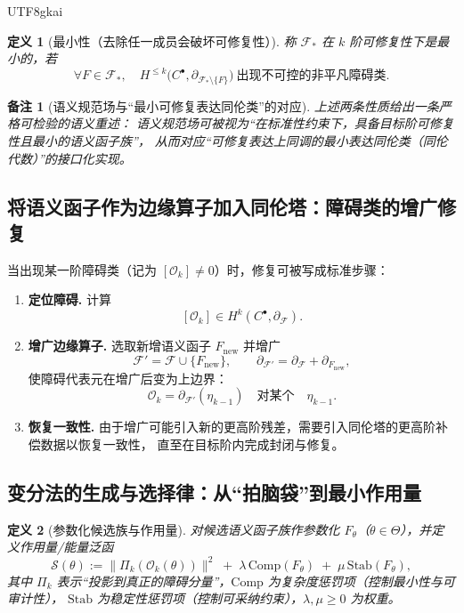 \documentclass[12pt]{article}
\newtheorem{definition}{定义}[section]
\newtheorem{remark}{备注}[section]
\begin{document}
\begin{CJK*}{UTF8}{gkai}
\begin{definition}[最小性（去除任一成员会破坏可修复性）]
称 $\mathcal{F}_\ast$ 在 $k$ 阶可修复性下是最小的，若
\[
\forall F\in \mathcal{F}_\ast,\quad
H^{\le k}\bigl(C^\bullet,\partial_{\mathcal{F}_\ast\setminus\{F\}}\bigr)\ \text{出现不可控的非平凡障碍类}.
\]
\end{definition}

\begin{remark}[语义规范场与“最小可修复表达同伦类”的对应]
上述两条性质给出一条严格可检验的语义重述：
语义规范场可被视为“在标准性约束下，具备目标阶可修复性且最小的语义函子族”，
从而对应“可修复表达上同调的最小表达同伦类（同伦代数）”的接口化实现。
\end{remark}

\subsection{将语义函子作为边缘算子加入同伦塔：障碍类的增广修复}
\label{subsec:tex20-ch2-homotopy-tower-repair}

当出现某一阶障碍类（记为 $[\mathcal{O}_k]\neq 0$）时，修复可被写成标准步骤：
\begin{enumerate}
  \item \textbf{定位障碍.} 计算
  \[
  [\mathcal{O}_k]\in H^k(C^\bullet,\partial_{\mathcal{F}}).
  \]
  \item \textbf{增广边缘算子.} 选取新增语义函子 $F_{\mathrm{new}}$ 并增广
  \[
  \mathcal{F}'=\mathcal{F}\cup\{F_{\mathrm{new}}\},
  \qquad
  \partial_{\mathcal{F}'}=\partial_{\mathcal{F}}+\partial_{F_{\mathrm{new}}},
  \]
  使障碍代表元在增广后变为上边界：
  \[
  \mathcal{O}_k=\partial_{\mathcal{F}'}(\eta_{k-1})
  \quad\text{对某个}\quad \eta_{k-1}.
  \]
  \item \textbf{恢复一致性.} 由于增广可能引入新的更高阶残差，需要引入同伦塔的更高阶补偿数据以恢复一致性，
  直至在目标阶内完成封闭与修复。\cite{EdgeOperatorTowerTex17,AxiomSemanticsWorkflowTex18}
\end{enumerate}

\subsection{变分法的生成与选择律：从“拍脑袋”到最小作用量}
\label{subsec:tex20-ch2-variational-selection}

\begin{definition}[参数化候选族与作用量]
对候选语义函子族作参数化 $F_\theta$（$\theta\in\Theta$），并定义作用量/能量泛函
\[
\mathcal{S}(\theta):=
\bigl\|\Pi_k(\mathcal{O}_k(\theta))\bigr\|^2
\;+\;
\lambda\,\mathrm{Comp}(F_\theta)
\;+\;
\mu\,\mathrm{Stab}(F_\theta),
\]
其中 $\Pi_k$ 表示“投影到真正的障碍分量”，$\mathrm{Comp}$ 为复杂度惩罚项（控制最小性与可审计性），
$\mathrm{Stab}$ 为稳定性惩罚项（控制可采纳约束），$\lambda,\mu\ge 0$ 为权重。
\end{definition}


\end{CJK*}
\end{document}
